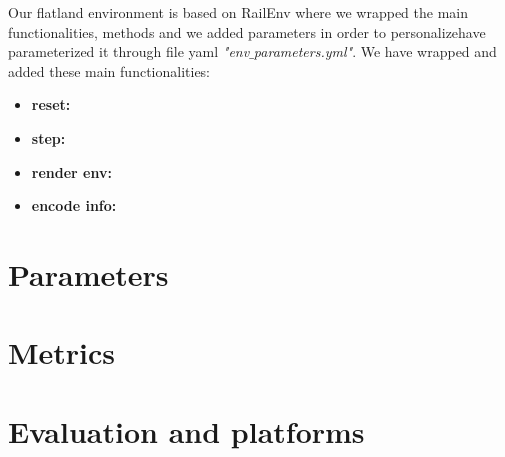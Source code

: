 Our flatland environment is based on RailEnv where we wrapped the main functionalities, methods and we added parameters in order to personalizehave parameterized it through file yaml \textit{"env$\_$parameters.yml"}. 
We have wrapped and added these main functionalities:
\begin{itemize}
\item \textbf{reset:}
\item \textbf{step:}
\item \textbf{render env:}
\item \textbf{encode info:}
\end{itemize}	
\section{Parameters}
\section{Metrics}
\section{Evaluation and platforms}
